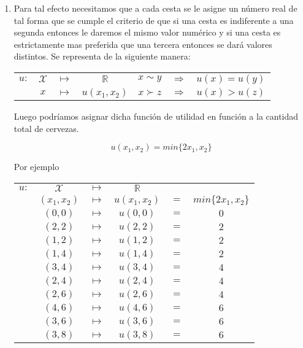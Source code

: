 \begin{enumerate}
\begin{enumerate}[\bfseries (3.1)]
	    \item Para tal efecto necesitamos que a cada cesta se le asigne un número real de tal forma que se cumple el criterio de que si una cesta es indiferente a una segunda entonces le daremos el mismo valor numérico y si una cesta es estrictamente mas preferida que una tercera entonces se dará valores distintos. Se representa de la siguiente manera:     
		\begin{tcolorbox}[colframe=white]
		\begin{center}
		    \begin{tabular}{rccc|ccc}
			$u:$&$\mathcal{X}$ & $\longmapsto$ & $\mathbb{R}$ & $x \sim y$ & $\Rightarrow$ & $u(x)=u(y)$\\
			    & $x$ & $\longmapsto$ & $u(x_1,x_2)$ & $x\succ z$&$\Rightarrow$&$u(x)>u(z)$\\
		    \end{tabular}
		\end{center}
		\end{tcolorbox}
		\vspace{.3cm}
		Luego podríamos asignar dicha función de utilidad en función a la cantidad total de cervezas. 

		\begin{tcolorbox}[colframe=white]
		$$u(x_1,x_2)=min\lbrace 2x_1,x_2 \rbrace$$
		\end{tcolorbox}
		Por ejemplo

		\begin{center}
		    \begin{tabular}{cccccc}
			$u:$&$\mathcal{X}$&$\longmapsto$&$\mathbb{R}$&&\\
			 & $(x_1,x_2)$ & $\longmapsto$&$u(x_1,x_2)$&$=$&$min\lbrace 2x_1,x_2\rbrace$\\
			    & $(0,0)$ & $\longmapsto$ & $u(0,0)$ & $=$ & $0$\\
			    & $(2,2)$ & $\longmapsto$ & $u(2,2)$ & $=$ & $2$\\
			    & $(1,2)$ & $\longmapsto$ & $u(1,2)$ & $=$ & $2$\\
			    & $(1,4)$ & $\longmapsto$ & $u(1,4)$ & $=$ & $2$\\
			    & $(3,4)$ & $\longmapsto$ & $u(3,4)$ & $=$ & $4$\\
			    & $(2,4)$ & $\longmapsto$ & $u(2,4)$ & $=$ & $4$\\
			    & $(2,6)$ & $\longmapsto$ & $u(2,6)$ & $=$ & $4$\\
			    & $(4,6)$ & $\longmapsto$ & $u(4,6)$ & $=$ & $6$\\
			    & $(3,6)$ & $\longmapsto$ & $u(3,6)$ & $=$ & $6$\\
			    & $(3,8)$ & $\longmapsto$ & $u(3,8)$ & $=$ & $6$\\
		    \end{tabular}
		\end{center} 
		\vspace{1cm}


\end{enumerate}
\end{enumerate}

